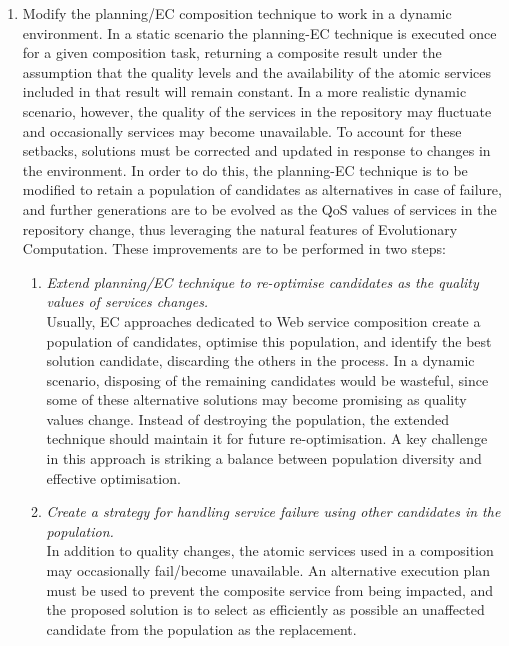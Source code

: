 \begin{enumerate}
 \item \label{obj:dyna} Modify the planning/EC composition technique to work in a dynamic environment. In a static scenario the planning-EC technique is executed once for a given composition task, returning a composite result under the assumption that the quality levels and the availability of the atomic services included in that result will remain constant. In a more realistic dynamic scenario, however, the quality of the services in the repository may fluctuate and occasionally services may become unavailable. To account for these setbacks, solutions must be corrected and updated in response to changes in the environment. In order to do this, the planning-EC technique is to be modified to retain a population of candidates as alternatives in case of failure, and further generations are to be evolved as the QoS values of services in the repository change, thus leveraging the natural features of Evolutionary Computation. These improvements are to be performed in two steps:
 
 \begin{enumerate}
 \item \label{obj:dyna-qos} \emph{Extend planning/EC technique to re-optimise candidates as the quality values of services changes.}\\
 Usually, EC approaches dedicated to Web service composition create a population of candidates, optimise this population, and identify the best solution candidate, discarding the others in the process. In a dynamic scenario, disposing of the remaining candidates would be wasteful, since some of these alternative solutions may become promising as quality values change. Instead of destroying the population, the extended technique should maintain it for future re-optimisation. A key challenge in this approach is striking a balance between population diversity and effective optimisation.
 \item \label{obj:dyna-fail} \emph{Create a strategy for handling service failure using other candidates in the population.}\\
 In addition to quality changes, the atomic services used in a composition may occasionally fail/become unavailable. An alternative execution plan must be used to prevent the composite service from being impacted, and the proposed solution is to select as efficiently as possible an unaffected candidate from the population as the replacement.
 \end{enumerate}
 
\end{enumerate}

